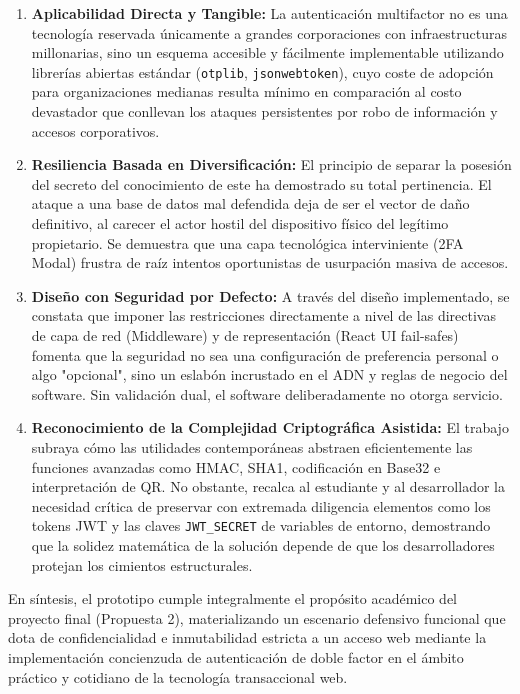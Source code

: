 \documentclass[12pt,a4paper]{article}
\begin{document}
\begin{enumerate}
    \item \textbf{Aplicabilidad Directa y Tangible:} La autenticación multifactor no es una tecnología reservada únicamente a grandes corporaciones con infraestructuras millonarias, sino un esquema accesible y fácilmente implementable utilizando librerías abiertas estándar (\texttt{otplib}, \texttt{jsonwebtoken}), cuyo coste de adopción para organizaciones medianas resulta mínimo en comparación al costo devastador que conllevan los ataques persistentes por robo de información y accesos corporativos.
    \item \textbf{Resiliencia Basada en Diversificación:} El principio de separar la posesión del secreto del conocimiento de este ha demostrado su total pertinencia. El ataque a una base de datos mal defendida deja de ser el vector de daño definitivo, al carecer el actor hostil del dispositivo físico del legítimo propietario. Se demuestra que una capa tecnológica interviniente (2FA Modal) frustra de raíz intentos oportunistas de usurpación masiva de accesos.
    \item \textbf{Diseño con Seguridad por Defecto:} A través del diseño implementado, se constata que imponer las restricciones directamente a nivel de las directivas de capa de red (Middleware) y de representación (React UI fail-safes) fomenta que la seguridad no sea una configuración de preferencia personal o algo "opcional", sino un eslabón incrustado en el ADN y reglas de negocio del software. Sin validación dual, el software deliberadamente no otorga servicio.
    \item \textbf{Reconocimiento de la Complejidad Criptográfica Asistida:} El trabajo subraya cómo las utilidades contemporáneas abstraen eficientemente las funciones avanzadas como HMAC, SHA1, codificación en Base32 e interpretación de QR. No obstante, recalca al estudiante y al desarrollador la necesidad crítica de preservar con extremada diligencia elementos como los tokens JWT y las claves \texttt{JWT\_SECRET} de variables de entorno, demostrando que la solidez matemática de la solución depende de que los desarrolladores protejan los cimientos estructurales.
\end{enumerate}

En síntesis, el prototipo cumple integralmente el propósito académico del proyecto final (Propuesta 2), materializando un escenario defensivo funcional que dota de confidencialidad e inmutabilidad estricta a un acceso web mediante la implementación concienzuda de autenticación de doble factor en el ámbito práctico y cotidiano de la tecnología transaccional web.
\end{document}
